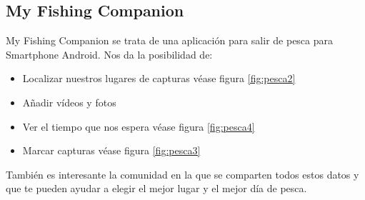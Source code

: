 \subsection{My Fishing Companion}
 My Fishing Companion se trata de una aplicación para salir de pesca para Smartphone Android. Nos da la posibilidad de:
\begin{itemize}
\item Localizar nuestros lugares de capturas  véase figura \ref{fig:pesca2}
 \item Añadir vídeos y fotos
 \item 	Ver el tiempo que nos espera véase figura \ref{fig:pesca4}
  \item  Marcar capturas  véase figura \ref{fig:pesca3}
\end{itemize} 
 
 
 También es interesante la comunidad en la que se comparten todos estos datos y que te pueden ayudar a elegir el mejor lugar y el mejor día de pesca.
 
